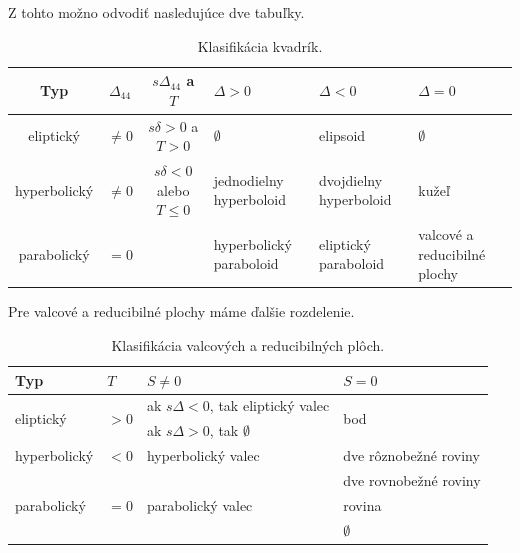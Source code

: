 Z tohto možno odvodiť nasledujúce dve tabuľky.

\begin{table}[H]
\centering
\begin{tabular}{|c|c|c|p{2.2cm}|p{2.15cm}|p{2cm}|}
\hline
Typ & $\Delta_{44}$ & $s\Delta_{44}$ a $T$ & $\Delta > 0$ & $\Delta < 0$ & $\Delta = 0$ \\
\hline
eliptický & $\neq 0$ & $s\delta>0$ a $T>0$ & $\emptyset$ & elipsoid & $\emptyset$ \\
\hline
hyperbolický & $\neq 0$ & $s\delta<0$ alebo $T \leq0$ & jednodielny hyperboloid & dvojdielny hyperboloid & kužeľ \\
\hline
parabolický & $=0$ & & hyperbolický paraboloid & eliptický paraboloid & valcové a reducibilné plochy \\
\hline
\end{tabular}
\caption{Klasifikácia kvadrík.}
\label{tab:classification_of_quadrics}
\end{table}


Pre valcové a reducibilné plochy máme ďalšie rozdelenie.

\begin{table}[H]
\centering
\begin{tabular}{|l|l|l|l|}
\hline
Typ & $T$ & $S \neq  0$ & $S = 0 $ \\
\hline
\multirow{2}{*}{eliptický} & \multirow{2}{*}{$> 0$} & ak $s\Delta < 0$, tak eliptický valec & \multirow{2}{*}{bod} \\
& & ak $s\Delta > 0$, tak $\emptyset$ &\\
\hline
hyperbolický & $< 0$ & hyperbolický valec & dve rôznobežné roviny \\
\hline
\multirow{3}{*}{parabolický} & \multirow{3}{*}{$= 0$} & \multirow{3}{*}{parabolický valec} & dve rovnobežné roviny \\
& & & rovina \\
& & & $\emptyset$ \\
\hline
\end{tabular}
\caption{Klasifikácia valcových a reducibilných plôch.}
\label{tab:degenerate_quadrics}
\end{table}

